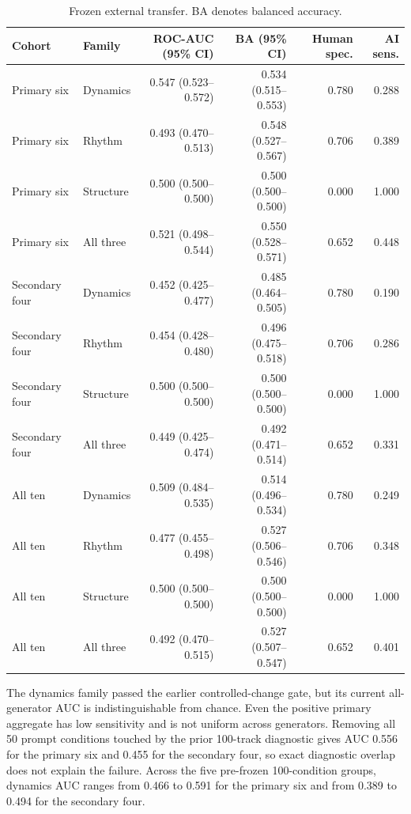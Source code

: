 \begin{table}[H]
\centering
\scriptsize
\caption{Frozen external transfer. BA denotes balanced accuracy.}
\label{tab:external-heuristic-aggregate}
\begin{tabular}{llrrrr}
\toprule
Cohort & Family & ROC-AUC (95\% CI) & BA (95\% CI) & Human spec. & AI sens. \\
\midrule
Primary six & Dynamics & 0.547 (0.523--0.572) & 0.534 (0.515--0.553) & 0.780 & 0.288 \\
Primary six & Rhythm & 0.493 (0.470--0.513) & 0.548 (0.527--0.567) & 0.706 & 0.389 \\
Primary six & Structure & 0.500 (0.500--0.500) & 0.500 (0.500--0.500) & 0.000 & 1.000 \\
Primary six & All three & 0.521 (0.498--0.544) & 0.550 (0.528--0.571) & 0.652 & 0.448 \\
\midrule
Secondary four & Dynamics & 0.452 (0.425--0.477) & 0.485 (0.464--0.505) & 0.780 & 0.190 \\
Secondary four & Rhythm & 0.454 (0.428--0.480) & 0.496 (0.475--0.518) & 0.706 & 0.286 \\
Secondary four & Structure & 0.500 (0.500--0.500) & 0.500 (0.500--0.500) & 0.000 & 1.000 \\
Secondary four & All three & 0.449 (0.425--0.474) & 0.492 (0.471--0.514) & 0.652 & 0.331 \\
\midrule
All ten & Dynamics & 0.509 (0.484--0.535) & 0.514 (0.496--0.534) & 0.780 & 0.249 \\
All ten & Rhythm & 0.477 (0.455--0.498) & 0.527 (0.506--0.546) & 0.706 & 0.348 \\
All ten & Structure & 0.500 (0.500--0.500) & 0.500 (0.500--0.500) & 0.000 & 1.000 \\
All ten & All three & 0.492 (0.470--0.515) & 0.527 (0.507--0.547) & 0.652 & 0.401 \\
\bottomrule
\end{tabular}
\end{table}

The dynamics family passed the earlier controlled-change gate, but its current
all-generator AUC is indistinguishable from chance. Even the positive primary
aggregate has low sensitivity and is not uniform across generators. Removing
all 50 prompt conditions touched by the prior 100-track diagnostic gives AUC
0.556 for the primary six and 0.455 for the secondary four, so exact diagnostic
overlap does not explain the failure. Across the five pre-frozen 100-condition
groups, dynamics AUC ranges from 0.466 to 0.591 for the primary six and from
0.389 to 0.494 for the secondary four.

